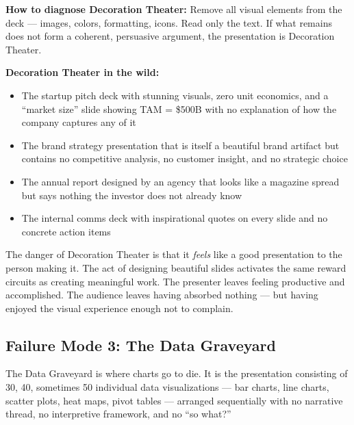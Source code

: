 \textbf{How to diagnose Decoration Theater:} Remove all visual elements from the deck --- images, colors, formatting, icons. Read only the text. If what remains does not form a coherent, persuasive argument, the presentation is Decoration Theater.

\textbf{Decoration Theater in the wild:}

\begin{itemize}
  \item The startup pitch deck with stunning visuals, zero unit economics, and a ``market size'' slide showing TAM = \$500B with no explanation of how the company captures any of it
  \item The brand strategy presentation that is itself a beautiful brand artifact but contains no competitive analysis, no customer insight, and no strategic choice
  \item The annual report designed by an agency that looks like a magazine spread but says nothing the investor does not already know
  \item The internal comms deck with inspirational quotes on every slide and no concrete action items
\end{itemize}

The danger of Decoration Theater is that it \emph{feels} like a good presentation to the person making it. The act of designing beautiful slides activates the same reward circuits as creating meaningful work. The presenter leaves feeling productive and accomplished. The audience leaves having absorbed nothing --- but having enjoyed the visual experience enough not to complain.

\subsection{Failure Mode 3: The Data Graveyard}

The Data Graveyard is where charts go to die. It is the presentation consisting of 30, 40, sometimes 50 individual data visualizations --- bar charts, line charts, scatter plots, heat maps, pivot tables --- arranged sequentially with no narrative thread, no interpretive framework, and no ``so what?''

